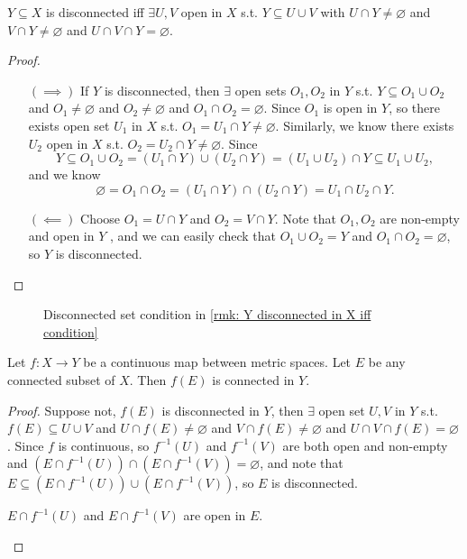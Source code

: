\begin{remark} \label{rmk: Y disconnected in X iff condition}
    \(Y \subseteq X\) is disconnected iff \(\exists U, V\) open in \(X\) s.t. \(Y \subseteq U \cup V\) with \(U \cap Y \neq \varnothing \) and \(V \cap Y \neq \varnothing \) and \(U \cap V \cap Y = \varnothing \).        
\end{remark}
\begin{proof}
    \vphantom{text} 
    \begin{itemize}
        \item [\((\implies )\)] If \(Y\) is disconnected, then \(\exists \) open sets \(O_1, O_2\) in \(Y\) s.t. \(Y \subseteq O_1 \cup O_2\) and \(O_1 \neq \varnothing \) and \(O_2 \neq \varnothing \) and \(O_1 \cap O_2 = \varnothing \). Since \(O_1\) is open in \(Y\), so there exists open set \(U_1\) in \(X\) s.t. \(O_1 = U_1 \cap Y \neq \varnothing \). Similarly, we know there exists \(U_2\) open in \(X\) s.t. \(O_2 = U_2 \cap Y \neq \varnothing \). Since 
        \[
            Y \subseteq O_1 \cup O_2 = (U_1 \cap Y) \cup (U_2 \cap Y) = (U_1 \cup U_2) \cap Y \subseteq U_1 \cup U_2,
        \] and we know
        \[
            \varnothing = O_1 \cap O_2 = (U_1 \cap Y) \cap (U_2 \cap Y) = U_1 \cap U_2 \cap Y.
        \]
        \item [\((\impliedby )\)] Choose \(O_1 = U \cap Y\) and \(O_2 = V \cap Y\). Note that \(O_1, O_2 \) are non-empty and open in \(Y\) , and we can easily check that \(O_1 \cup O_2 = Y\) and \(O_1 \cap O_2 = \varnothing \), so \(Y\) is disconnected.       
    \end{itemize}
\end{proof}
\begin{figure}[H]
    \centering
    \caption{Disconnected set condition in \autoref{rmk: Y disconnected in X iff condition}}
    \label{fig:disconnectedSet}
\end{figure}
\begin{theorem} \label{thm: continuous map preserve connectedness}
    Let \(f : X \to Y\) be a continuous map between metric spaces. Let \(E\) be any connected subset of \(X\). Then \(f(E)\) is connected in \(Y\).     
\end{theorem}
\begin{proof}
    Suppose not, \(f(E)\) is disconnected in \(Y\), then \(\exists \) open set \(U, V\) in \(Y\) s.t. \(f(E) \subseteq U \cup V\) and \(U \cap f(E) \neq \varnothing \) and \(V \cap f(E) \neq \varnothing \) and \(U \cap V \cap f(E) = \varnothing \). Since \(f\) is continuous, so \(f^{-1}(U)\) and \(f^{-1}(V)\) are both open and non-empty and \(\left( E \cap  f^{-1}(U) \right)  \cap \left( E \cap f^{-1}(V) \right)  = \varnothing \), and note that \(E \subseteq \left( E \cap  f^{-1}(U) \right)  \cup \left( E \cap f^{-1}(V) \right)\), so \(E\) is disconnected.         
    \begin{remark}
        \(E \cap f^{-1}(U)\) and \(E \cap f^{-1}(V)\) are open in \(E\).   
    \end{remark}     
\end{proof}

